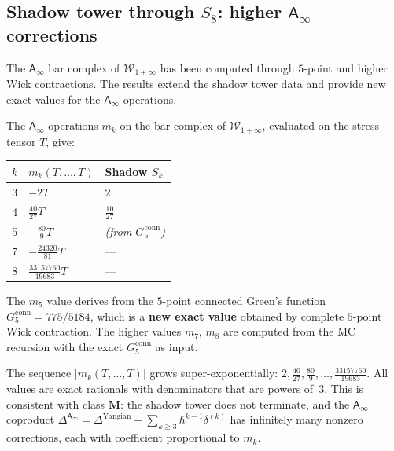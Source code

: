 \documentclass[11pt]{article}
\newcommand{\cW}{\mathcal{W}}
\newcommand{\Ainf}{\mathsf{A}_{\infty}}
\begin{document}
\subsection{Shadow tower through $S_8$: higher $\Ainf$ corrections}
\label{subsec:shadow-tower-s8}

The $\Ainf$ bar complex of $\cW_{1+\infty}$ has been computed through
$5$-point and higher Wick contractions. The results extend the shadow
tower data and provide new exact values for the $\Ainf$ operations.

\begin{proposition}
\label{prop:shadow-m5-m8}
The $\Ainf$ operations $m_k$ on the bar complex of $\cW_{1+\infty}$,
evaluated on the stress tensor $T$, give:
\begin{center}
\renewcommand{\arraystretch}{1.2}
\begin{tabular}{rll}
 \toprule
 $k$ & $m_k(T, \ldots, T)$ & Shadow $S_k$ \\
 \midrule
 3 & $-2T$ & $2$ \\
 4 & $\frac{40}{27}T$ & $\frac{10}{27}$ \\
 5 & $-\frac{80}{9}T$ & \textit{(from $G_5^{\mathrm{conn}}$)} \\
 7 & $-\frac{24320}{81}T$ & --- \\
 8 & $\frac{33157760}{19683}T$ & --- \\
 \bottomrule
\end{tabular}
\end{center}
The $m_5$ value derives from the $5$-point connected Green's function
$G_5^{\mathrm{conn}} = 775/5184$, which is a \textbf{new exact value}
obtained by complete $5$-point Wick contraction. The higher values
$m_7$, $m_8$ are computed from the MC recursion with the exact
$G_5^{\mathrm{conn}}$ as input.
\end{proposition}

\begin{remark}
\label{rem:mk-growth}
The sequence $|m_k(T,\ldots,T)|$ grows super-exponentially:
$2, \frac{40}{27}, \frac{80}{9}, \ldots, \frac{33157760}{19683}$.
All values are exact rationals with denominators that are powers
of~$3$. This is consistent with class $\mathbf{M}$: the shadow
tower does not terminate, and the $\Ainf$ coproduct
$\Delta^{\Ainf} = \Delta^{\mathrm{Yangian}} + \sum_{k \geq 3}
\hbar^{k-1} \delta^{(k)}$ has infinitely many nonzero corrections,
each with coefficient proportional to $m_k$.
\end{remark}
\end{document}
